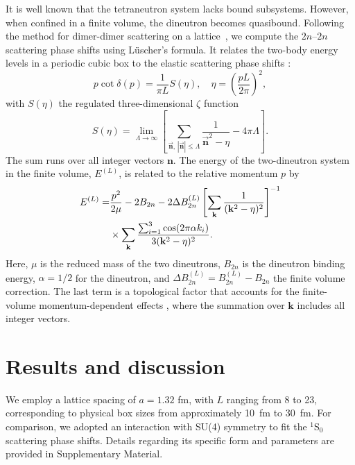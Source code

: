 \documentclass[aps,prl,showpacs,twocolumn,preprintnumbers,superscriptaddress,nofootinbib,floatfix,10pt]{revtex4-1}
\begin{document}
It is well known that the tetraneutron system lacks bound subsystems.
However, when confined in a finite volume, the dineutron becomes quasibound.
Following the method for dimer-dimer scattering on a lattice~\cite{Elhatisari:2016hui}, we compute the $2n$--$2n$ scattering phase shifts using L\"uscher's formula.
It relates the two-body energy levels in a periodic cubic box to the elastic scattering phase shifts \cite{Luscher:1986pf,Luscher:1990ux}:
\begin{equation}
    p \cot \delta(p) = \frac{1}{\pi L} {S(\eta)}, \quad \eta = \left( \frac{pL}{2\pi} \right)^2,
\end{equation}
with $S(\eta)$ the regulated three-dimensional $\zeta$ function
\begin{equation}
    S(\eta) = \lim_{\Lambda\to \infty} \left[ \sum_{\vec{\bm{n}},\, |\vec{\bm{n}}| \leq \Lambda} \frac{1}{\vec{\bm{n}}^2 - \eta} - 4\pi \Lambda \right].
\end{equation}
The sum runs over all integer vectors $\mathbf{n}$.
The energy of the two-dineutron system in the finite volume, $E^{(L)}$, is related to the relative momentum $p$ by
\begin{align}
    E^{(L)} =& \frac{p^2}{2\mu} - 2 B_{2n} - 2 \Delta B_{2n}^{(L)} \left[ \sum_{\mathbf{k}} \frac{1}{(\mathbf{k}^2-\eta)^2} \right]^{-1} \notag \\
    & \times \sum_{\mathbf{k}} \frac{\sum_{i=1}^{3} \cos(2\pi\alpha k_i)}{3(\mathbf{k}^2-\eta)^2}.
    \label{eqn:E-momentum-01}
\end{align}
Here, $\mu$ is the reduced mass of the two dineutrons, $B_{2n}$ is the dineutron binding energy, $\alpha = 1/2$ for the dineutron, and $\Delta B_{2n}^{(L)} = B_{2n}^{(L)} - B_{2n}$ the finite volume correction.
The last term is a topological factor that accounts for the finite-volume momentum-dependent effects \cite{Bour:2011ef},
where the summation over $\mathbf{k}$ includes all integer vectors.




\section{Results and discussion}

We employ a lattice spacing of $a = 1.32$ fm, with $L$ ranging from 8 to 23, corresponding to physical box sizes from approximately 10~fm to 30~fm.
For comparison, we adopted an interaction with SU(4) symmetry to fit the $^1$S$_0$ scattering phase shifts. Details regarding its specific form and parameters are provided in Supplementary Material.
\end{document}
